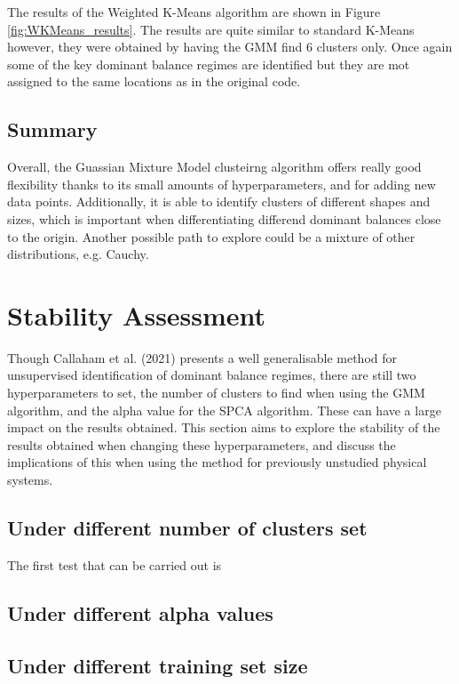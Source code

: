 \documentclass[12pt]{report} %
\begin{document}
The results of the Weighted K-Means algorithm are shown in Figure \ref{fig:WKMeans_results}. The results are quite similar to standard K-Means however, they were obtained by having the GMM find 6 clusters only. Once again some of the key dominant balance regimes are identified but they are mot assigned to the same locations as in the original code.

\subsection{Summary}

Overall, the Guassian Mixture Model clusteirng algorithm offers really good flexibility thanks to its small amounts of hyperparameters, and for adding new data points. Additionally, it is able to identify clusters of different shapes and sizes, which is important when differentiating differend dominant balances close to the origin. Another possible path to explore could be a mixture of other distributions, e.g. Cauchy.

\section{Stability Assessment}

Though Callaham et al. (2021)\cite{callaham2021learning} presents a well generalisable method for unsupervised identification of dominant balance regimes, there are still two hyperparameters to set, the number of clusters to find when using the GMM algorithm, and the alpha value for the SPCA algorithm. These can have a large impact on the results obtained. This section aims to explore the stability of the results obtained when changing these hyperparameters, and discuss the implications of this when using the method for previously unstudied physical systems.

\subsection{Under different number of clusters set}

The first test that can be carried out is

\subsection{Under different alpha values}

\subsection{Under different training set size}
\end{document}
